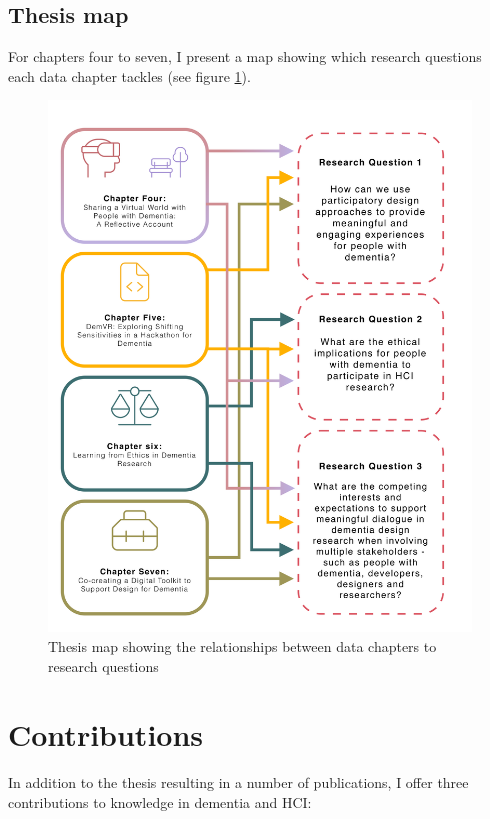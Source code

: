 \newpage
\subsection{Thesis map}
For chapters four to seven, I present a map showing which research questions each data chapter tackles (see figure \ref{fig:RQ_and_Chapters}).

\label{Intro:Thesis Map}
\begin{figure}[htp]
\centering
\includegraphics[width=.8\linewidth]{Images/Thesis_Narrative/RQ_and_Chapters.png}
\caption{Thesis map showing the relationships between data chapters to research questions}
\label{fig:RQ_and_Chapters}
\end{figure}


\section{Contributions}
\label{Intro:Contribution}
In addition to the thesis resulting in a number of publications, I offer three contributions to knowledge in dementia and HCI:

